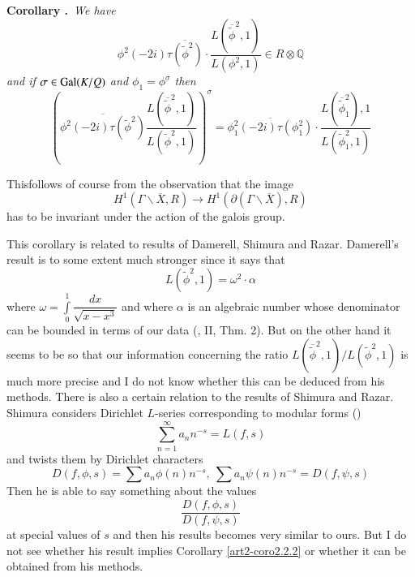 \medskip
\noindent
{\bf Corollary .\label{art2-coro2.2.3}}~{\em We have}
$$
\phi^{2}(-2i)\overline{\tau(\widetilde{\phi}^{2})}\cdot \frac{L(\overline{\widetilde{\phi}}^{2},1)}{L(\phi^{2},1)}\in R\otimes \mathbb{Q}
$$
{\em and if $\sigma\in \operatorname{Gal}(K/Q)$ and $\phi_{1}=\phi^{\sigma}$ then}
$$
\left(\overline{\phi^{2}(-2i)\tau(\widetilde{\phi}^{2})}\dfrac{L(\overline{\widetilde{\phi}}^{2},1)}{L(\widetilde{\phi}^{2},1)}\right)^{\sigma}=\overline{\phi^{2}_{1}(-2i)\tau(\phi^{2}_{1})}\cdot \dfrac{L(\overline{\widetilde{\phi}}^{2}_{1}),1}{L(\widetilde{\phi}^{2}_{1},1)}
$$

This\pageoriginale follows of course from the observation that the image
$$
H^{1}(\Gamma\backslash \overline{X},R)\to H^{1}(\partial(\Gamma\backslash \overline{X}),R)
$$
has to be invariant under the action of the galois group.

This corollary is related to results of Damerell, Shimura and Razar. Damerell's result is to some extent much stronger since it says that 
$$
L(\widetilde{\phi}^{2},1)=\omega^{2}\cdot \alpha
$$
where $\omega=\int\limits^{1}_{0}\dfrac{dx}{\sqrt{x-x^{3}}}$ and where $\alpha$ is an algebraic number whose denominator can be bounded in terms of our data (\cite{art2-key4}, II, Thm. 2). But on the other hand it seems to be so that our information concerning the ratio $L(\overline{\widetilde{\phi}}^{2},1)/L(\widetilde{\phi}^{2},1)$ is much more precise and I do not know whether this can be deduced from his methods. There is also a certain relation to the results of Shimura and Razar. Shimura considers Dirichlet $L$-series corresponding to modular forms (\cite{art2-key23})
$$
\sum\limits^{\infty}_{n=1}a_{n}n^{-s}=L(f,s)
$$
and twists them by Dirichlet characters
$$
D(f,\phi,s)=\sum a_{n}\phi(n)n^{-s}, \ \sum a_{n}\psi(n)n^{-s}=D(f,\psi,s)
$$
Then he is able to say something about the values
$$
\dfrac{D(f,\phi,s)}{D(f,\psi,s)}
$$
at special values of $s$ and then his results becomes very similar to ours. But I do not see whether his result implies Corollary \ref{art2-coro2.2.2} or whether it can be obtained from his methods.


